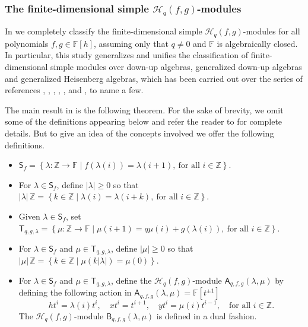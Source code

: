\documentclass{commat}
\newcommand{\FF}{\mathbb{F}}
\newcommand{\ZZ}{\mathbb{Z}}
\newcommand{\hqfg}[1][f,g]{\mathcal{H}_q(#1)}
\newcommand{\Sf}[1][f]{\mathsf{S}_{#1}}
\newcommand{\Tf}[1][q, g, \lambda]{\mathsf{T}_{#1}}
\newcommand{\Af}[1][\lambda, \mu]{\mathsf{A}_{q, f,g}(#1)}
\newcommand{\Bf}[1][\lambda, \mu]{\mathsf{B}_{q, f,g}(#1)}
\newcommand{\pb}[1]{\left\{ #1\right\}}
\begin{document}
\subsubsection{The finite-dimensional simple \texorpdfstring{$\hqfg$}{Hq(g,f)}-modules}\label{SSS:irreps}
In \cite{LR22ca} we completely classify the finite-dimensional simple $\hqfg$-modules for all polynomials $f, g\in\FF[h]$, assuming only that $q\neq 0$ and $\FF$ is algebraically closed. In particular, this study generalizes and unifies the classification of finite-dimensional simple modules over down-up algebras, generalized down-up algebras and generalized Heisenberg algebras, which has been carried out over the series of references \cite{BR98}, \cite{CM00}, \cite{CS04}, \cite{LZ15}, \cite{spS90}, \cite{lLB95} and \cite{sR02}, to name a few. 

The main result in \cite{LR22ca} is the following theorem. For the sake of brevity, we omit some of the definitions appearing below and refer the reader to \cite[Sec.\ 3]{LR22ca} for complete details. But to give an idea of the concepts involved we offer the following definitions.

\begin{itemize}
	\item $\displaystyle \Sf=\pb{\lambda:\ZZ\longrightarrow\FF\mid f(\lambda(i))=\lambda(i+1), \ \mbox{for all $i\in\ZZ$}}$.
	\item For $\lambda\in\Sf$, define $|\lambda|\geq 0$ so that  $\displaystyle |\lambda|\,\ZZ=\pb{k\in\ZZ\mid \lambda(i)=\lambda(i+k), \ \mbox{for all $i\in\ZZ$}}$.
	
	\item Given $\lambda\in\Sf$, set $\displaystyle \Tf=\pb{\mu:\ZZ\longrightarrow\FF\mid \mu(i+1)=q\mu(i)+g(\lambda(i)), \ \mbox{for all $i\in\ZZ$}}$.
	
	\item For $\lambda\in\Sf$ and $\mu\in\Tf$, define $|\mu|\geq 0$ so that $\displaystyle |\mu|\,\ZZ= \pb{k\in\ZZ\mid\mu(k|\lambda|)=\mu(0)}$.
	
	\item For $\lambda\in\Sf$ and $\mu\in\Tf$, define the $\hqfg$-module $\Af$ by
	defining the following action in $\Af=\FF[t^{\pm 1}]$
	\begin{equation*}
		ht^i=\lambda(i)t^i, \quad xt^i=t^{i+1}, \quad yt^i=\mu(i)t^{i-1}, \quad \mbox{for all $i\in\ZZ$.}
	\end{equation*}
	The $\hqfg$-module $\Bf$ is defined in a dual fashion.
\end{itemize}
\end{document}
